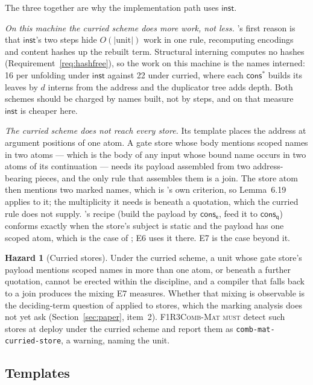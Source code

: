 \documentclass[11pt,a4paper]{article}
\newcommand{\code}[1]{\texttt{#1}}
\newcommand{\Mat}{\textsc{F1R3Comb-Mat}}
\newcommand{\MUST}{\textsc{must}}
\newcommand{\ev}{\mathsf{e}}
\newcommand{\qq}{\mathsf{q}}
\newcommand{\cons}{\mathsf{cons}}
\theoremstyle{definition}
\newtheorem{hazard}[definition]{Hazard}
\theoremstyle{plain}
\newcommand{\inst}{\mathsf{inst}}
\newcommand{\cstar}{\mathsf{cons}^{*}}
\begin{document}
The three together are why the implementation path uses $\inst$.

\emph{On this machine the curried scheme does more work, not less.}
\cite[Rem.~5.22]{combspec}'s first reason is that $\inst$'s two steps hide
$O(|\mathrm{unit}|)$ work in one rule, recomputing encodings and content
hashes up the rebuilt term. Structural interning computes no hashes
(Requirement~\ref{req:hashfree}), so the work on this machine is the names
interned: 16 per unfolding under $\inst$ against 22 under curried, where each
$\cstar$ builds its leaves by $d$ interns from the address and the duplicator
tree adds depth. Both schemes should be charged by names built, not by steps,
and on that measure $\inst$ is cheaper here.

\emph{The curried scheme does not reach every store.} Its template places the
address at argument positions of one atom. A gate store whose body mentions
scoped names in two atoms --- which is the body of any input whose bound name
occurs in two atoms of its continuation --- needs its payload assembled from
two address-bearing pieces, and the only rule that assembles them is a join.
The store atom then mentions two marked names, which is
\cite[Rem.~6.20]{draft3}'s own criterion, so Lemma~6.19 applies to it; the
multiplicity it needs is beneath a quotation, which the curried rule does not
supply. \cite[Req.~4.9]{combspec}'s recipe (build the payload by $\cons_{\ev}$,
feed it to $\cons_{\qq}$) conforms exactly when the store's subject is static
and the payload has one scoped atom, which is the case of
\cite[Ex.~6.9]{draft3}; E6 uses it there. E7 is the case beyond it.

\begin{hazard}[Curried stores]\label{haz:curriedstores}
Under the curried scheme, a unit whose gate store's payload mentions scoped
names in more than one atom, or beneath a further quotation, cannot be erected
within the discipline, and a compiler that falls back to a join produces the
mixing E7 measures. Whether that mixing is observable is the deciding-term
question of \cite[Ex.~6.21]{draft3} applied to stores, which the marking
analysis does not yet ask (Section~\ref{sec:paper}, item~2). \Mat{} \MUST{}
detect such stores at deploy under the curried scheme and report them as
\code{comb-mat-curried-store}, a warning, naming the unit.
\end{hazard}

\subsection{Templates}
\end{document}

